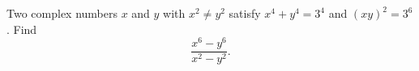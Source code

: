 Two complex numbers $x$ and $y$ with $x^2\ne y^2$ satisfy $x^4+y^4=3^4$ and $(xy)^2=3^6$. Find
\[\dfrac{x^6-y^6}{x^2-y^2}.\]

